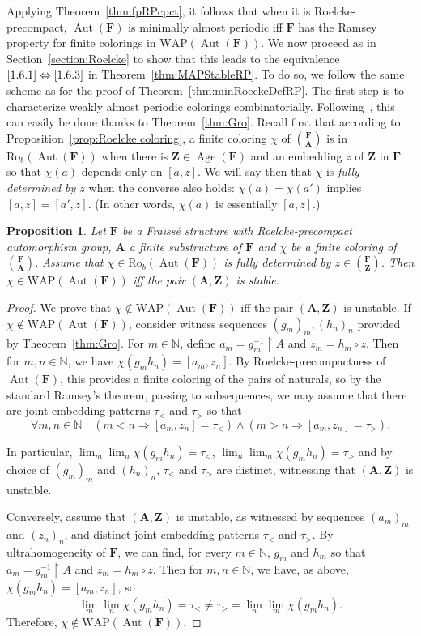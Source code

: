 \documentclass[11pt]{article}
\newtheorem{prop}[theo]{Proposition}
\theoremstyle{definition}
\numberwithin{equation}{section}
\numberwithin{figure}{section}
\numberwithin{table}{section}
\newcommand{\N}{\mathbb{N}}
\newcommand*{\mA}{\mathbf{A}}
\newcommand*{\mF}{\mathbf{F}}
\newcommand*{\mZ}{\mathbf{Z}}
\newcommand{\restrict}[2]{#1 \upharpoonright #2}
\DeclareMathOperator{\Aut}{Aut}
\DeclareMathOperator{\Age}{Age}
\newcommand{\ROB}{\mathrm{Ro}_{b}}
\newcommand{\WAP}{\mathrm{WAP}}
\let\oldforall\forall
\renewcommand*{\forall}{\mathrel{\oldforall}}
\begin{document}
Applying Theorem~\ref{thm:fpRPcpct}, it follows that when it is Roelcke-precompact, $\Aut(\mF)$ is minimally almost periodic iff $\mF$ has the Ramsey property for finite colorings in $\WAP(\Aut(\mF))$. We now proceed as in Section~\ref{section:Roelcke} to show that this leads to the equivalence $\eqref{1.6.1}\Leftrightarrow \eqref{1.6.3}$ in Theorem~\ref{thm:MAPStableRP}. To do so, we follow the same scheme as for the proof of Theorem~\ref{thm:minRoeckeDefRP}. The first step is to characterize weakly almost periodic colorings combinatorially. Following~\cite{BYT}, this can easily be done thanks to Theorem~\ref{thm:Gro}. Recall first that according to Proposition~\ref{prop:Roelcke coloring}, a finite coloring $\chi$ of $\binom{\mF}{\mA}$ is in $\ROB(\Aut(\mF))$ when there is $\mZ \in \Age(\mF)$ and an embedding $z$ of $\mZ$ in $\mF$ so that $\chi(a)$ depends only on $[a,z]$. We will say then that $\chi$ is \emph{fully determined by $z$} when the converse also holds: $\chi(a)=\chi(a')$ implies $[a,z]=[a',z]$. (In other words, $\chi(a)$ is essentially $[a,z]$.)

\begin{prop}\label{prop:WAPStable}
Let $\mF$ be a Fra\"{\i}ss\'e structure with Roelcke-precompact automorphism group, $\mA$ a finite substructure of $\mF$ and $\chi$ be a finite coloring of $\binom{\mF}{\mA}$. Assume that $\chi\in \ROB(\Aut(\mF))$ is fully determined by $z\in \binom{\mF}{\mZ}$. Then $\chi\in \WAP(\Aut(\mF))$ iff the pair $(\mA, \mZ)$ is stable.
\end{prop}

\begin{proof}
We prove that $\chi\notin \WAP(\Aut(\mF))$ iff the pair $(\mA, \mZ)$ is unstable. If $\chi\notin \WAP(\Aut(\mF))$, consider witness sequences $(g_{m})_{m}, (h_{n})_{n}$ provided by Theorem~\ref{thm:Gro}. For $m\in \N$, define $a_{m}=\restrict{g_{m}^{-1}}{A}$ and $z_{m}=h_{m}\circ z$. Then for $m,n\in \N$, we have $\chi(g_{m}h_{n})=[a_{m},z_{n}]$. By Roelcke-precompactness of $\Aut(\mF)$, this provides a finite coloring of the pairs of naturals, so by the standard Ramsey's theorem, passing to subsequences, we may assume that there are joint embedding patterns $\tau_{<}$ and $\tau_{>}$ so that
\[
\forall m,n\in \N \quad (m<n \Rightarrow [a_{m},z_{n}]=\tau_{<})\wedge (m>n \Rightarrow [a_{m},z_{n}]=\tau_{>}).
\]

In particular, $\lim_{m}\lim_{n}\chi(g_{m}h_{n})=\tau_{<}$, $\lim_{n}\lim_{m}\chi(g_{m}h_{n})=\tau_{>}$ and by choice of $(g_{m})_{m}$ and $(h_{n})_{n}$, $\tau_{<}$ and $\tau_{>}$ are distinct, witnessing that $(\mA, \mZ)$ is unstable.

Conversely, assume that $(\mA, \mZ)$ is unstable, as witnessed by sequences $(a_{m})_{m}$ and $(z_{n})_{n}$, and distinct joint embedding patterns $\tau_{<}$ and $\tau_{>}$. By ultrahomogeneity of $\mF$, we can find, for every $m\in \N$, $g_{m}$ and $h_{m}$ so that $a_{m}=\restrict{g_{m}^{-1}}{A}$ and $z_{m}=h_{m}\circ z$. Then for $m,n\in \N$, we have, as above, $\chi(g_{m}h_{n})=[a_{m},z_{n}]$, so
\[
\lim_{m}\lim_{n}\chi(g_{m}h_{n})=\tau_{<}\neq \tau_{>} = \lim_{n}\lim_{m}\chi(g_{m}h_{n}).
\]
Therefore, $\chi\notin \WAP(\Aut(\mF))$.
\end{proof}
\end{document}
